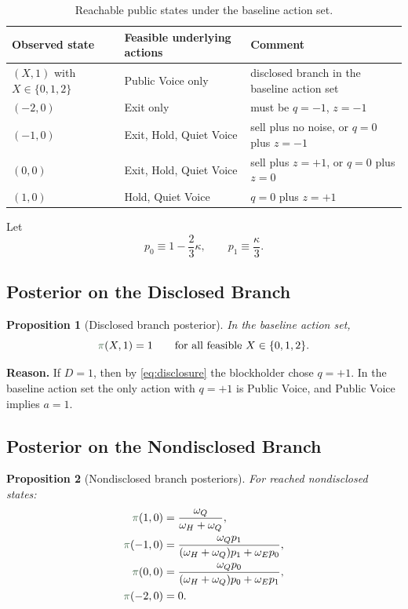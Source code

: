 \documentclass[11pt,a4paper]{article}
\theoremstyle{definition}
\theoremstyle{plain}
\newtheorem{proposition}{Proposition}[section]
\theoremstyle{remark}
\newcommand{\1}{\mathbf{1}}
\newcommand{\outcome}[1]{{\color{ForestGreen!50!black}#1}}
\begin{document}
\begin{table}[h]
\centering
\begin{tabularx}{0.96\textwidth}{@{}p{}p{}X@{}}
\toprule
Observed state & Feasible underlying actions & Comment \\
\midrule
$(X,1)$ with $X\in\{0,1,2\}$ & Public Voice only & disclosed branch in the baseline action set \\
$(-2,0)$ & Exit only & must be $q=-1$, $z=-1$ \\
$(-1,0)$ & Exit, Hold, Quiet Voice & sell plus no noise, or $q=0$ plus $z=-1$ \\
$(0,0)$ & Exit, Hold, Quiet Voice & sell plus $z=+1$, or $q=0$ plus $z=0$ \\
$(1,0)$ & Hold, Quiet Voice & $q=0$ plus $z=+1$ \\
\bottomrule
\end{tabularx}
\caption{Reachable public states under the baseline action set.}
\label{tab:state-map}
\end{table}

Let
\begin{equation}
p_0 \equiv 1-\frac{2}{3}\kappa,
\qquad
p_1 \equiv \frac{\kappa}{3}.
\label{eq:p0p1}
\end{equation}

\subsection{Posterior on the Disclosed Branch}

\begin{proposition}[Disclosed branch posterior]
\label{prop:disclosed}
In the baseline action set,
\begin{equation}
\outcome{\pi}(X,1)=1
\qquad
\text{for all feasible } X\in\{0,1,2\}.
\label{eq:pi-disclosed}
\end{equation}
\end{proposition}

\textbf{Reason.}
If $D=1$, then by \eqref{eq:disclosure} the blockholder chose $q=+1$. In the baseline action set the only action with $q=+1$ is Public Voice, and Public Voice implies $a=1$.

\subsection{Posterior on the Nondisclosed Branch}

\begin{proposition}[Nondisclosed branch posteriors]
\label{prop:nondisclosed}
For reached nondisclosed states:
\begin{align}
\outcome{\pi}(1,0)
&=
\frac{\omega_Q}{\omega_H+\omega_Q},
\label{eq:pi10}
\\
\outcome{\pi}(-1,0)
&=
\frac{\omega_Q p_1}{(\omega_H+\omega_Q)p_1 + \omega_E p_0},
\label{eq:pim10}
\\
\outcome{\pi}(0,0)
&=
\frac{\omega_Q p_0}{(\omega_H+\omega_Q)p_0 + \omega_E p_1},
\label{eq:pi00}
\\
\outcome{\pi}(-2,0)
&=
0.
\label{eq:pim20}
\end{align}
\end{proposition}
\end{document}

